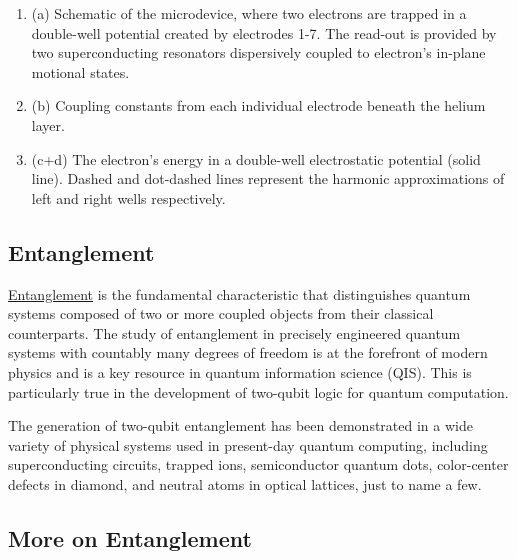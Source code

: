 \documentclass[%
oneside,                 %
final,                   %
10pt]{article}
\begin{document}
\vspace{6mm}

\begin{enumerate}
\item (a) Schematic of the microdevice, where two electrons are trapped in a double-well potential created by electrodes 1-7. The read-out is provided by two superconducting resonators dispersively coupled to  electron's in-plane motional states.

\item (b) Coupling constants from each individual electrode beneath the helium layer.

\item (c+d) The electron's energy in a  double-well electrostatic potential (solid line). Dashed and dot-dashed lines represent the harmonic approximations of left and right wells respectively.
\end{enumerate}

\noindent
\subsection{Entanglement}

\begin{block}{}
\href{{https://link.springer.com/content/pdf/10.1007/s11232-007-0098-9.pdf}}{Entanglement} is the fundamental characteristic that distinguishes
quantum systems composed of two or more coupled objects from their
classical counterparts. The study of entanglement in precisely
engineered quantum systems with countably many degrees of freedom is
at the forefront of modern physics and is a key resource in quantum
information science (QIS). This is particularly true in the
development of two-qubit logic for quantum computation.
\end{block}

\begin{block}{}
The
generation of two-qubit entanglement has been demonstrated in a wide
variety of physical systems used in present-day quantum computing,
including superconducting circuits, trapped
ions, semiconductor quantum dots, color-center
defects in diamond, and neutral atoms in optical
lattices, just to name a few.
\end{block}

\subsection{More on Entanglement}
\end{document}

